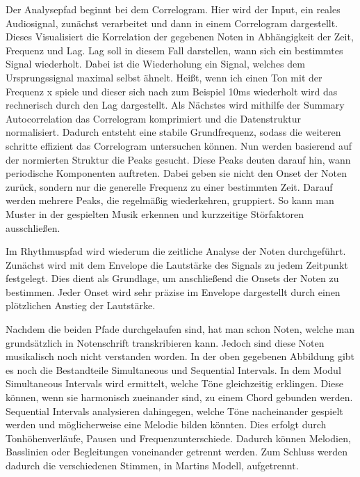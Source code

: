 Der Analysepfad beginnt bei dem Correlogram.
Hier wird der Input, ein reales Audiosignal,
zunächst verarbeitet und dann in einem Correlogram dargestellt.
Dieses Visualisiert die Korrelation der gegebenen Noten in Abhängigkeit der Zeit, Frequenz und Lag.
Lag soll in diesem Fall darstellen, wann sich ein bestimmtes Signal wiederholt.
Dabei ist die Wiederholung ein Signal, welches dem Ursprungssignal maximal selbst ähnelt.
Heißt, wenn ich einen Ton mit der Frequenz x spiele
und dieser sich nach zum Beispiel 10ms wiederholt wird das rechnerisch durch den Lag dargestellt.
Als Nächstes wird mithilfe der Summary Autocorrelation das Correlogram komprimiert
und die Datenstruktur normalisiert.
Dadurch entsteht eine stabile Grundfrequenz,
sodass die weiteren schritte effizient das Correlogram untersuchen können.
Nun werden basierend auf der normierten Struktur die Peaks gesucht.
Diese Peaks deuten darauf hin, wann periodische Komponenten auftreten.
Dabei geben sie nicht den Onset der Noten zurück, sondern nur die generelle Frequenz zu einer bestimmten Zeit.
Darauf werden mehrere Peaks, die regelmäßig wiederkehren, gruppiert.
So kann man Muster in der gespielten Musik erkennen und kurzzeitige Störfaktoren ausschließen.

Im Rhythmuspfad wird wiederum die zeitliche Analyse der Noten durchgeführt.
Zunächst wird mit dem Envelope die Lautstärke des Signals zu jedem Zeitpunkt festgelegt.
Dies dient als Grundlage, um anschließend die Onsets der Noten zu bestimmen.
Jeder Onset wird sehr präzise im Envelope dargestellt durch einen plötzlichen Anstieg der Lautstärke.

Nachdem die beiden Pfade durchgelaufen sind, hat man schon Noten,
welche man grundsätzlich in Notenschrift transkribieren kann.
Jedoch sind diese Noten musikalisch noch nicht verstanden worden.
In der oben gegebenen Abbildung gibt es noch die Bestandteile Simultaneous und Sequential Intervals.
In dem Modul Simultaneous Intervals wird ermittelt, welche Töne gleichzeitig erklingen.
Diese können, wenn sie harmonisch zueinander sind, zu einem Chord gebunden werden.
Sequential Intervals analysieren dahingegen, welche Töne nacheinander gespielt werden und
möglicherweise eine Melodie bilden könnten.
Dies erfolgt durch Tonhöhenverläufe, Pausen und Frequenzunterschiede.
Dadurch können Melodien, Basslinien oder Begleitungen voneinander getrennt werden.
Zum Schluss werden dadurch die verschiedenen Stimmen, in Martins Modell, aufgetrennt.

